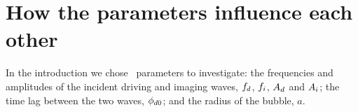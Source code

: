 









\section{How the parameters influence each other}\label{sec:comp:examples}

In the introduction we chose \numparam\ parameters to investigate:
the frequencies and amplitudes of the incident driving and imaging waves,
${f_d}$, ${f_i}$, ${A_d}$ and ${A_i}$;
the time lag between the two waves, ${\phi_{d0}}$;
and the radius of the bubble, $a$.

